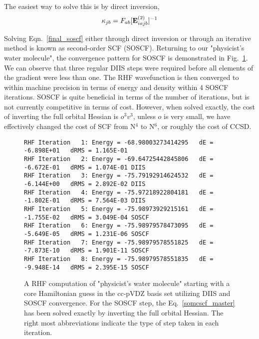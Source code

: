 \documentclass[aip,jcp,preprint,superscriptaddress,floatfix]{revtex4-1}
\begin{document}
The easiest way to solve this is by direct inversion,
\begin{eqnarray}
\kappa_{jb} = F_{ab} [ {\rm\bf E}^{(2)}_{iajb} ] ^ {-1}
\end{eqnarray}

Solving Eqn.~\ref{final_soscf} either through direct inversion or through an iterative method is known as second-order SCF (SOSCF).
Returning to our "physicist's water molecule", the convergence pattern for SOSCF is demonstrated in Fig.~\ref{rhf_water_soscf}.
We can observe that three regular DIIS steps were required before all elements of the gradient were less than one.
The RHF wavefunction is then converged to within machine precision in terms of energy and density within 4 SOSCF iterations.
SOSCF is quite beneficial in terms of the number of iterations, but is not currently competitive in terms of cost.
 However, when solved exactly, the cost of inverting the full orbital Hessian is $o^3v^3$, unless $o$ is very small, we have effectively changed the cost of SCF from N$^4$ to N$^6$, or roughly the cost of CCSD.

\begin{figure}[htbp]
\begin{center}
\caption{A RHF computation of "physicist's water molecule" starting with a core Hamiltonian guess in the cc-pVDZ basis set utilizing DIIS and SOSCF convergence. For the SOSCF step, the Eq.~\ref{somcscf_master} has been solved exactly by inverting the full orbital Hessian. The right most abbreviations indicate the type of step taken in each iteration.}
\label{rhf_water_soscf}
{\footnotesize\linespread{1}\normalfont\ttfamily
\begin{verbatim}
RHF Iteration   1: Energy = -68.98003273414295   dE = -6.898E+01   dRMS = 1.165E-01
RHF Iteration   2: Energy = -69.64725442845806   dE = -6.672E-01   dRMS = 1.074E-01 DIIS
RHF Iteration   3: Energy = -75.79192914624532   dE = -6.144E+00   dRMS = 2.892E-02 DIIS
RHF Iteration   4: Energy = -75.97218922804181   dE = -1.802E-01   dRMS = 7.564E-03 DIIS
RHF Iteration   5: Energy = -75.98973929215161   dE = -1.755E-02   dRMS = 3.049E-04 SOSCF
RHF Iteration   6: Energy = -75.98979578473095   dE = -5.649E-05   dRMS = 1.231E-06 SOSCF
RHF Iteration   7: Energy = -75.98979578551825   dE = -7.873E-10   dRMS = 1.901E-11 SOSCF
RHF Iteration   8: Energy = -75.98979578551835   dE = -9.948E-14   dRMS = 2.395E-15 SOSCF
\end{verbatim}}
\end{center}
\end{figure}
\end{document}
